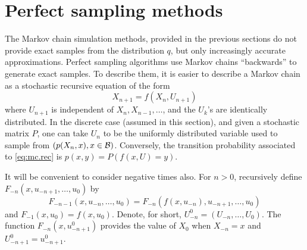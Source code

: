  
 \section{Perfect sampling methods}
\label{sec:perfect}
The  Markov chain simulation methods, provided in the previous sections  do not provide exact samples from the distribution
$q$, but only increasingly accurate approximations.
 Perfect sampling algorithms \citep{pp96,pp98,fill98} use Markov chains ``backwards'' to generate exact samples. To describe them, it is easier to describe a
Markov chain as a stochastic recursive equation of the form
\begin{equation}
\label{eq:mc.rec}
X_{n+1} = f(X_n, U_{n+1})
\end{equation}
where $U_{n+1}$ is independent of  $X_n, X_{n-1}, \ldots$, and the $U_k$'s are identically distributed. In the discrete case (assumed in this section), and given a
stochastic matrix $P$, one can take $U_n$
to be the uniformly distributed variable used to sample from
$(p(X_n, x), x\in{\mathcal B})$. Conversely, the transition probability
associated to \cref{eq:mc.rec} is
$p(x,y) = P(f(x, U) = y).$

It will be convenient to consider negative times also. For $n>0$,
recursively define
$F_{-n}(x, u_{-n+1}, \ldots, u_0)$ by
$$
F_{-n-1} (x, u_{-n}, \ldots, u_0) = F_{-n}(f(x, u_{-n}), u_{-n+1},
\ldots, u_0)
$$
and $F_{-1}(x,u_0) = f(x, u_0)$. 
Denote, for short, $U_{-n}^0 =
(U_{-n}, \ldots, U_0)$. The function $F_{-n}(x, u_{-n+1}^0)$ provides
the value of $X_0$ when $X_{-n}=x$ and $U_{-n+1}^0 =
u_{-n+1}^0$. 

